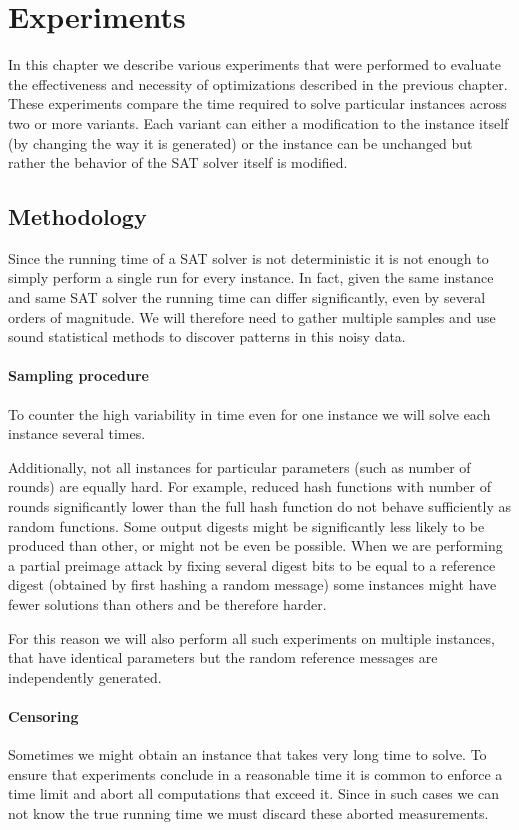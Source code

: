 \chapter{Experiments}

In this chapter we describe various experiments that were performed to evaluate the effectiveness and necessity of optimizations described in the previous chapter.
These experiments compare the time required to solve particular instances across two or more variants.
Each variant can either a modification to the instance itself (by changing the way it is generated) or the instance can be unchanged but rather the behavior of the SAT solver itself is modified.

\section{Methodology}
Since the running time of a SAT solver is not deterministic it is not enough to simply perform a single run for every instance.
In fact, given the same instance and same SAT solver the running time can differ significantly, even by several orders of magnitude.
We will therefore need to gather multiple samples and use sound statistical methods to discover patterns in this noisy data.

\subsubsection{Sampling procedure}
To counter the high variability in time even for one instance we will solve each instance several times.

Additionally, not all instances for particular parameters (such as number of rounds) are equally hard.
For example, reduced hash functions with number of rounds significantly lower than the full hash function do not behave sufficiently as random functions.
Some output digests might be significantly less likely to be produced than other, or might not be even be possible.
When we are performing a partial preimage attack by fixing several digest bits to be equal to a reference digest (obtained by first hashing a random message) some instances might have fewer solutions than others and be therefore harder.

For this reason we will also perform all such experiments on multiple instances, that have identical parameters but the random reference messages are independently generated.

\subsubsection{Censoring}
Sometimes we might obtain an instance that takes very long time to solve.
To ensure that experiments conclude in a reasonable time it is common to enforce a time limit and abort all computations that exceed it.
Since in such cases we can not know the true running time we must discard these aborted measurements.

